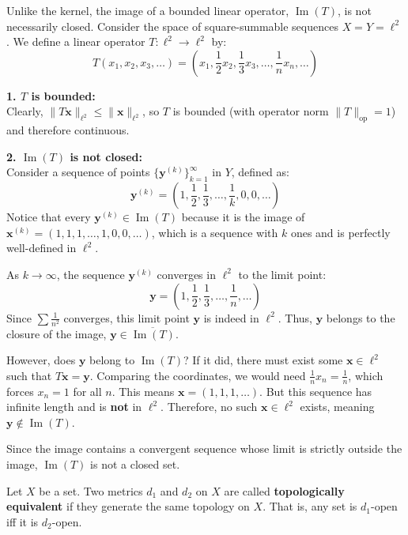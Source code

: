 \begin{remark}
Unlike the kernel, the image of a bounded linear operator, $\operatorname{Im}(T)$, is not necessarily closed. 
Consider the space of square-summable sequences $X = Y = \ell^2$. We define a linear operator $T: \ell^2 \to \ell^2$ by:
\[ T(x_1, x_2, x_3, \dots) = \left( x_1, \frac{1}{2}x_2, \frac{1}{3}x_3, \dots, \frac{1}{n}x_n, \dots \right) \]

\textbf{1. $T$ is bounded:} \\
Clearly, $\|T\mathbf{x}\|_{\ell^2} \le \|\mathbf{x}\|_{\ell^2}$, so $T$ is bounded (with operator norm $\|T\|_{\mathrm{op}} = 1$) and therefore continuous.

\textbf{2. $\operatorname{Im}(T)$ is not closed:} \\
Consider a sequence of points $\{\mathbf{y}^{(k)}\}_{k=1}^\infty$ in $Y$, defined as:
\[ \mathbf{y}^{(k)} = \left( 1, \frac{1}{2}, \frac{1}{3}, \dots, \frac{1}{k}, 0, 0, \dots \right) \]
Notice that every $\mathbf{y}^{(k)} \in \operatorname{Im}(T)$ because it is the image of $\mathbf{x}^{(k)} = (1, 1, 1, \dots, 1, 0, 0, \dots)$, which is a sequence with $k$ ones and is perfectly well-defined in $\ell^2$.

As $k \to \infty$, the sequence $\mathbf{y}^{(k)}$ converges in $\ell^2$ to the limit point:
\[ \mathbf{y} = \left( 1, \frac{1}{2}, \frac{1}{3}, \dots, \frac{1}{n}, \dots \right) \]
Since $\sum \frac{1}{n^2}$ converges, this limit point $\mathbf{y}$ is indeed in $\ell^2$. 
Thus, $\mathbf{y}$ belongs to the closure of the image, $\mathbf{y} \in \overline{\operatorname{Im}(T)}$.

However, does $\mathbf{y}$ belong to $\operatorname{Im}(T)$? If it did, there must exist some $\mathbf{x} \in \ell^2$ such that $T\mathbf{x} = \mathbf{y}$. 
Comparing the coordinates, we would need $\frac{1}{n}x_n = \frac{1}{n}$, which forces $x_n = 1$ for all $n$. 
This means $\mathbf{x} = (1, 1, 1, \dots)$. But this sequence has infinite length and is \textbf{not} in $\ell^2$. 
Therefore, no such $\mathbf{x} \in \ell^2$ exists, meaning $\mathbf{y} \notin \operatorname{Im}(T)$.

Since the image contains a convergent sequence whose limit is strictly outside the image, $\operatorname{Im}(T)$ is not a closed set.
\end{remark}

\begin{definition}
Let $X$ be a set. Two metrics $d_1$ and $d_2$ on $X$ are called \textbf{topologically equivalent} if they generate the same topology on $X$. 
That is, any set is $d_1$-open iff it is $d_2$-open.
\end{definition}


